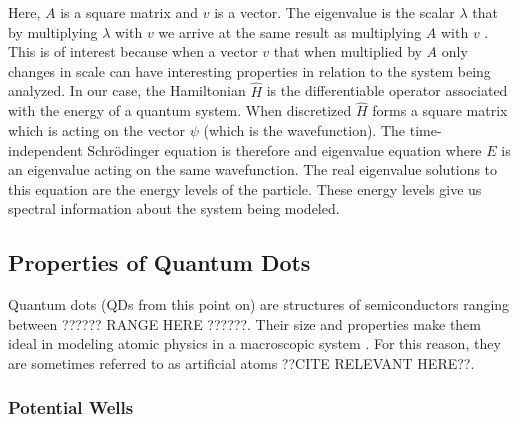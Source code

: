 \documentclass[authoryearcitations]{UoYCSproject}
\begin{document}
Here, $A$ is a square matrix and $v$ is a vector. The eigenvalue is the scalar $\lambda$ that by multiplying 
$\lambda$ with $v$ we arrive at the same result as multiplying $A$ with $v$ \cite{Hamming}. This is of interest
because when a vector $v$ that when multiplied by $A$ only changes in scale can have interesting properties in relation
to the system being analyzed. In our case, the Hamiltonian $\hat{H}$ is the differentiable operator associated with 
the energy of a quantum system. When discretized $\hat{H}$ forms a square matrix which is acting on the vector $\psi$
(which is the wavefunction). The time-independent Schr\"{o}dinger equation is therefore and eigenvalue equation where
$E$ is an eigenvalue acting on the same wavefunction. 
The real eigenvalue solutions to this equation are the energy levels
of the particle. These energy levels give us spectral information about the system being modeled. 





\subsection{Properties of Quantum Dots}
Quantum dots (QDs from this point on) are structures of semiconductors ranging between ??????
RANGE HERE ??????. Their size and properties make them ideal in modeling atomic physics in a
macroscopic system \cite{Li}. For this reason, they are sometimes referred to as artificial atoms 
??CITE RELEVANT HERE??.

\subsubsection{Potential Wells}
\end{document}
